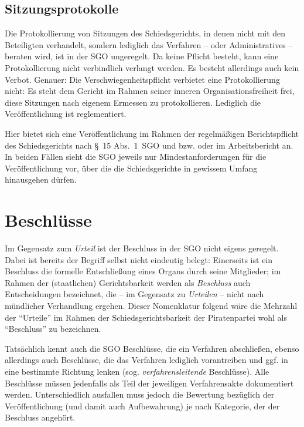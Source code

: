 \subsection{Sitzungsprotokolle}
\label{Dokumentation:Protokolle:Sitzungsprotokolle}
Die Protokollierung von Sitzungen des Schiedsgerichts, in denen nicht mit den Beteiligten verhandelt, sondern lediglich das Verfahren -- oder Administratives -- beraten wird, ist in der SGO ungeregelt.
Da keine Pflicht besteht, kann eine Protokollierung nicht verbindlich verlangt werden.
Es besteht allerdings auch kein Verbot.
Genauer:
Die Verschwiegenheitspflicht verbietet eine Protokollierung nicht:
Es steht dem Gericht im Rahmen seiner inneren Organisationsfreiheit frei, diese Sitzungen nach eigenem Ermessen zu protokollieren.
Lediglich die Veröffentlichung ist reglementiert.

Hier bietet sich eine Veröffentlichung im Rahmen der regelmäßigen Berichtspflicht des Schiedsgerichts nach \S~15 Abs.~1~SGO und bzw. oder im Arbeitsbericht an.
In beiden Fällen sieht die SGO jeweils nur Mindestanforderungen für die Veröffentlichung vor, über die die Schiedsgerichte in gewissem Umfang hinausgehen dürfen.

\section{Beschlüsse}
\label{Dokumentation:Beschlüsse}
Im Gegensatz zum \emph{Urteil} ist der Beschluss in der SGO nicht eigens geregelt.
Dabei ist bereits der Begriff selbst nicht eindeutig belegt:
Einerseits ist ein Beschluss die formelle Entschließung eines Organs durch seine Mitglieder; im Rahmen der (staatlichen) Gerichtsbarkeit werden als \emph{Beschluss} auch Entscheidungen bezeichnet, die -- im Gegensatz zu \emph{Urteilen} -- nicht nach mündlicher Verhandlung ergehen.
Dieser Nomenklatur folgend wäre die Mehrzahl der \enquote{Urteile} im Rahmen der Schiedsgerichtsbarkeit der Piratenpartei wohl als \enquote{Beschluss} zu bezeichnen.%

Tatsächlich kennt auch die SGO Beschlüsse, die ein Verfahren abschließen, ebenso allerdings auch Beschlüsse, die das Verfahren lediglich vorantreiben und ggf. in eine bestimmte Richtung lenken (sog. \emph{verfahrensleitende} Beschlüsse).
Alle Beschlüsse müssen jedenfalls als Teil der jeweiligen Verfahrensakte dokumentiert werden.
Unterschiedlich ausfallen muss jedoch die Bewertung bezüglich der Veröffentlichung (und damit auch Aufbewahrung) je nach Kategorie, der der Beschluss angehört.

